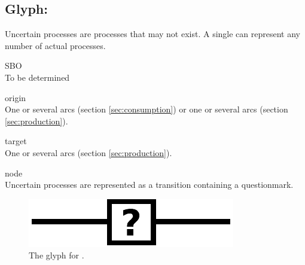 \subsection{Glyph: }\label{sec:uncertain}

Uncertain processes are processes that may not exist. A single  can represent any number of actual processes.

\begin{glyphDescription}
 \item[SBO]\mbox{}\\ To be determined
 \item[origin]\mbox{}\\ One or several  arcs (section \ref{sec:consumption}) or one or several  arcs (section \ref{sec:production}).
 \item[target]\mbox{}\\ One or several  arcs (section \ref{sec:production}).
 \item[node]\mbox{}\\ Uncertain processes are represented as a transition containing a questionmark.
 \end{glyphDescription}

\begin{figure}[H]
  \centering
  \includegraphics[scale = 0.5]{images/uncertain}
  \caption{The \PD glyph for .}
  \label{fig:uncertain}
\end{figure}

